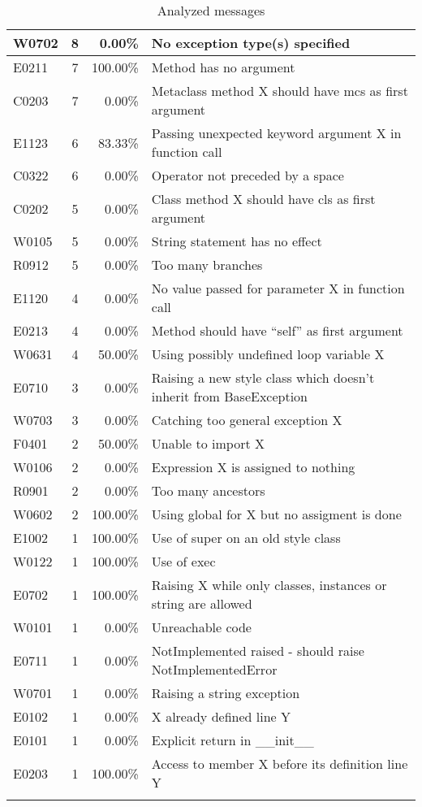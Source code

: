 \documentclass[11pt, a4paper]{article}
\begin{document}
\begin{longtable}{|l|c|r|m{9.2cm}|}
\hline
W0702 & 8 & 0.00\% & No exception type(s) specified \\
\hline
E0211 & 7 & 100.00\% & Method has no argument \\
\hline
C0203 & 7 & 0.00\% & Metaclass method X should have mcs as first argument \\
\hline
E1123 & 6 & 83.33\% & Passing unexpected keyword argument X in function call \\
\hline
C0322 & 6 & 0.00\% & Operator not preceded by a space \\
\hline
C0202 & 5 & 0.00\% & Class method X should have cls as first argument \\
\hline
W0105 & 5 & 0.00\% & String statement has no effect \\
\hline
R0912 & 5 & 0.00\% & Too many branches \\
\hline
E1120 & 4 & 0.00\% & No value passed for parameter X in function call \\
\hline
E0213 & 4 & 0.00\% & Method should have \enquote{self} as first argument \\
\hline
W0631 & 4 & 50.00\% & Using possibly undefined loop variable X \\
\hline
E0710 & 3 & 0.00\% & Raising a new style class which doesn't inherit from BaseException \\
\hline
W0703 & 3 & 0.00\% & Catching too general exception X \\
\hline
F0401 & 2 & 50.00\% & Unable to import X \\
\hline
W0106 & 2 & 0.00\% & Expression X is assigned to nothing \\
\hline
R0901 & 2 & 0.00\% & Too many ancestors \\
\hline
W0602 & 2 & 100.00\% & Using global for X but no assigment is done \\
\hline
E1002 & 1 & 100.00\% & Use of super on an old style class \\
\hline
W0122 & 1 & 100.00\% & Use of exec \\
\hline
E0702 & 1 & 100.00\% & Raising X while only classes, instances or string are allowed \\
\hline
W0101 & 1 & 0.00\% & Unreachable code \\
\hline
E0711 & 1 & 0.00\% & NotImplemented raised - should raise NotImplementedError \\
\hline
W0701 & 1 & 0.00\% & Raising a string exception \\
\hline
E0102 & 1 & 0.00\% & X already defined line Y \\
\hline
E0101 & 1 & 0.00\% & Explicit return in \_\_init\_\_ \\
\hline
E0203 & 1 & 100.00\% & Access to member X before its definition line Y \\
\hline
\caption{\label{messages} Analyzed messages}
\end{longtable}
\end{document}
